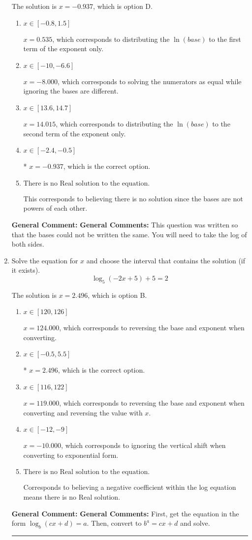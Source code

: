 \documentclass{extbook}[14pt]
\newcommand{\litem}[1]{\item #1

\rule{\textwidth}{0.4pt}}
\begin{document}
\begin{enumerate}
{The solution is \( x = -0.937 \), which is option D.\begin{enumerate}[label=\Alph*.]
\item \( x \in [-0.8, 1.5] \)

$x = 0.535$, which corresponds to distributing the $\ln(base)$ to the first term of the exponent only.
\item \( x \in [-10, -6.6] \)

$x = -8.000$, which corresponds to solving the numerators as equal while ignoring the bases are different.
\item \( x \in [13.6, 14.7] \)

$x = 14.015$, which corresponds to distributing the $\ln(base)$ to the second term of the exponent only.
\item \( x \in [-2.4, -0.5] \)

* $x = -0.937$, which is the correct option.
\item \( \text{There is no Real solution to the equation.} \)

This corresponds to believing there is no solution since the bases are not powers of each other.
\end{enumerate}

\textbf{General Comment:} \textbf{General Comments:} This question was written so that the bases could not be written the same. You will need to take the log of both sides.
}
\litem{
Solve the equation for $x$ and choose the interval that contains the solution (if it exists).
\[ \log_{5}{(-2x+5)}+5 = 2 \]

The solution is \( x = 2.496 \), which is option B.\begin{enumerate}[label=\Alph*.]
\item \( x \in [120, 126] \)

$x = 124.000$, which corresponds to reversing the base and exponent when converting.
\item \( x \in [-0.5, 5.5] \)

* $x = 2.496$, which is the correct option.
\item \( x \in [116, 122] \)

$x = 119.000$, which corresponds to reversing the base and exponent when converting and reversing the value with $x$.
\item \( x \in [-12, -9] \)

$x = -10.000$, which corresponds to ignoring the vertical shift when converting to exponential form.
\item \( \text{There is no Real solution to the equation.} \)

Corresponds to believing a negative coefficient within the log equation means there is no Real solution.
\end{enumerate}

\textbf{General Comment:} \textbf{General Comments:} First, get the equation in the form $\log_b{(cx+d)} = a$. Then, convert to $b^a = cx+d$ and solve.
}
\end{enumerate}
\end{document}
